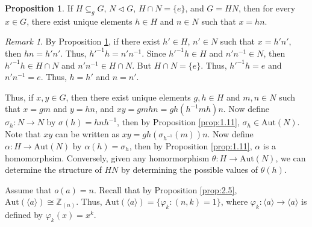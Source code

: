 \documentclass{article}
\makeatletter
\theoremstyle{definition}
\newtheorem{prop}{Proposition}[section]
\theoremstyle{remark}
\newtheorem*{remark}{Remark}
\let\oldproofname=\proofname
\renewcommand{\proofname}{\bf{\textit{\oldproofname}}}
\theoremstyle{definition}
\renewenvironment{proof}[1][\proofname]{\par
  \pushQED{\qed}%
  \normalfont \topsep6\p@\@plus6\p@\relax
  \list{}{\leftmargin=0mm
          \rightmargin=0mm
          \settowidth{\itemindent}{\itshape#1}%
          \labelwidth=4mm
          \parsep=0pt \listparindent=0mm%
  }
  \item[\hskip\labelsep
        \itshape
    #1\@addpunct{.}]\ignorespaces
}{%
  \popQED\endlist\@endpefalse
}
\makeatother
\begin{document}
    \begin{prop}\label{prop:2.6}
        If $H\subseteq_g G$, $N\triangleleft G$, $H\cap N=\{e\}$, and $G=HN$, then for every $x\in G$, there exist unique elements $h\in H$ and $n\in N$ such that $x=hn$.
    \end{prop}
        \begin{proof}
        
        \end{proof}
        
    \begin{remark}
        By Proposition \ref{prop:2.6}, if there exist $h'\in H$, $n'\in N$ such that $x=h'n'$, then $hn=h'n'$. Thus, $h'^{-1}h=n'n^{-1}$. Since $h'^{-1}h\in H$ and $n'n^{-1}\in N$, then $h'^{-1}h\in H\cap N$ and $n'n^{-1}\in H\cap N$. But $H\cap N=\{e\}$. Thus, $h'^{-1}h=e$ and $n'n^{-1}=e$. Thus, $h=h'$ and $n=n'$.\par Thus, if $x,y\in G$, then there exist unique elements $g,h\in H$ and $m,n\in N$ such that $x=gm$ and $y=hn$, and $xy=gmhn=gh(h^{-1}mh)n$. Now define $\sigma_h\colon N\rightarrow N$ by $\sigma(h)=hnh^{-1}$, then by Proposition \ref{prop:1.11}, $\sigma_h\in\text{Aut}(N)$. Note that $xy$ can be written as $xy=gh(\sigma_{h^{-1}}(m))n$. Now define $\alpha\colon H\rightarrow\text{Aut}(N)$ by $\alpha(h)=\sigma_h$, then by Proposition \ref{prop:1.11}, $\alpha$ is a homomorphsim. Conversely, given any homormorphism $\theta\colon H\rightarrow\text{Aut}(N)$, we can determine the structure of $HN$ by determining the possible values of $\theta(h)$.\par\hspace{4mm} Assume that $o(a)=n$. Recall that by Proposition \ref{prop:2.5}, $\text{Aut}(\langle a\rangle)\cong\mathbb{Z}_{(n)}$. Thus, $\text{Aut}(\langle a\rangle)=\{\varphi_k\colon (n,k)=1\}$, where $\varphi_k\colon \langle a\rangle\rightarrow\langle a\rangle$ is defined by $\varphi_k(x)=x^k$.
    \end{remark}
    
\end{document}
